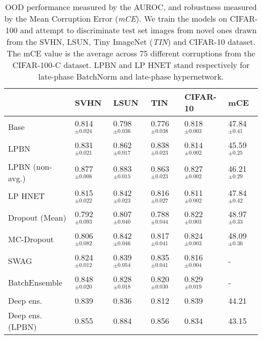\documentclass{article} \usepackage{iclr2021_conference,times}
\begin{document}
\setlength\intextsep{5pt}
\begin{table}
\centering
\caption{OOD performance measured by the AUROC, and robustness measured by the Mean Corruption Error (\emph{mCE}). We train the models on CIFAR-100 and attempt to discriminate test set images from novel ones drawn from the SVHN, LSUN, Tiny ImageNet (\emph{TIN}) and CIFAR-10 dataset. The mCE value is the average across 75 different corruptions from the CIFAR-100-C dataset. LPBN and LP HNET stand respectively for late-phase BatchNorm and late-phase hypernetwork. \label{tab:c100-detailed-ood}}
\label{tab:ood_mce}
\begin{tabular}{llllll}

\toprule
               & SVHN	& LSUN	& TIN	& CIFAR-10 & mCE \\\midrule
Base   &  0.814$^{\pm 0.024}$  &0.798$^{\pm 0.036}$   &0.776$^{\pm 0.038}$&0.818$^{\pm 0.003}$  & 47.84$^{\pm 0.41}$\\
LPBN     & 0.831$^{\pm 0.021}$  & 0.862$^{\pm 0.017}$  &0.838$^{\pm 0.023}$  &0.814$^{\pm 0.002}$  & 45.59$^{\pm 0.25}$       \\
LPBN (non-avg.)  &  0.877$^{\pm 0.008}$  &0.883$^{\pm 0.015}$  &0.863$^{\pm 0.023}$  &0.827$^{\pm 0.002}$  & 46.21$^{\pm 0.29}$     \\
LP HNET      &0.815$^{\pm 0.022}$ &   0.842$^{\pm 0.023}$  &0.816$^{\pm 0.027}$   &0.811$^{\pm 0.002}$  & 47.84$^{\pm 0.42}$   \\\midrule
Dropout (Mean)      & 0.792$^{\pm 0.093}$ &  0.807$^{\pm 0.040}$  &   0.788$^{\pm 0.044}$ &   0.822$^{\pm 0.003}$  & 48.97$^{\pm 0.33}$\\
MC-Dropout      & 0.806$^{\pm 0.082}$ &  0.842$^{\pm 0.046}$  &   0.817$^{\pm 0.041}$ &   0.824$^{\pm 0.003}$  & 48.09$^{\pm 0.36}$ \\

SWAG      &  0.824$^{\pm 0.012}$  &0.839$^{\pm 0.054}$  &0.835$^{\pm 0.041}$  &0.816$^{\pm 0.004}$  &  -  \\

BatchEnsemble     &  0.848$^{\pm 0.020}$  &0.828$^{\pm 0.018}$  &0.820$^{\pm 0.030}$  & 0.829$^{\pm 0.019}$  &  -     \\

\midrule
Deep ens. &  0.839  & 0.836  &0.812  &0.839  & 44.21 \\
Deep ens. (LPBN)  &  0.855  &0.884  &0.856  &0.834  &43.15 \\
\bottomrule       
\end{tabular}
\end{table}
\end{document}
